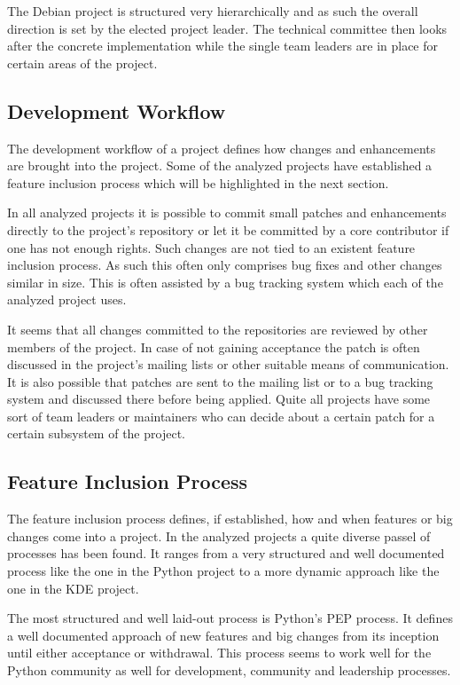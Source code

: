 The Debian project is structured very hierarchically and as such the overall
direction is set by the elected project leader. The technical committee then
looks after the concrete implementation while the single team leaders are in
place for certain areas of the project.


\subsection{Development Workflow} %

The development workflow of a project defines how changes and enhancements are
brought into the project. Some of the analyzed projects have established a
feature inclusion process which will be highlighted in the next section.

In all analyzed projects it is possible to commit small patches and
enhancements directly to the project's repository or let it be committed by a
core contributor if one has not enough rights. Such changes are not tied to an
existent feature inclusion process. As such this often only comprises bug fixes
and other changes similar in size. This is often assisted by a bug tracking
system which each of the analyzed project uses.

It seems that all changes committed to the repositories are reviewed by other
members of the project. In case of not gaining acceptance the patch is often
discussed in the project's mailing lists or other suitable means of
communication. It is also possible that patches are sent to the mailing list or
to a bug tracking system and discussed there before being applied. Quite all
projects have some sort of team leaders or maintainers who can decide about a
certain patch for a certain subsystem of the project.


\subsection{Feature Inclusion Process} %

The feature inclusion process defines, if established, how and when features or
big changes come into a project. In the analyzed projects a quite diverse
passel of processes has been found. It ranges from a very structured and well
documented process like the one in the Python project to a more dynamic
approach like the one in the KDE project.

The most structured and well laid-out process is Python's \ac{PEP} process. It
defines a well documented approach of new features and big changes from its
inception until either acceptance or withdrawal. This process seems to work
well for the Python community as well for development, community and leadership
processes.

